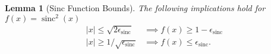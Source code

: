 \documentclass{article}
\newtheorem{lemma}[theorem]{Lemma}
\DeclareMathOperator{\sinc}{sinc}
\begin{document}
\begin{lemma}[Sinc Function Bounds] \label{lem:sinc_poly_approx}
    The following implications hold for $f(x) = \sinc^2(x)$
    \begin{align}
        |x| \leq \sqrt{2 \epsilon_{\sinc}} &\implies f(x) \geq 1 - \epsilon_{\sinc} \label{eq:sinc_lower_bound}\\
        |x| \geq 1 / \sqrt{\epsilon_{\sinc}} &\implies f(x) \leq \epsilon_{\sinc}. \label{eq:sinc_upper_bound}
    \end{align}
\end{lemma}
\end{document}

